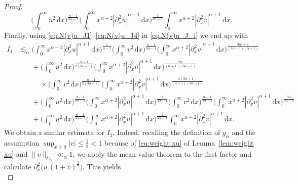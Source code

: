 \documentclass[10pt,a4paper]{amsart}
\renewcommand{\d}{\ensuremath{\mathrm{d}}}
\begin{document}
\begin{proof}
\begin{equation}
    \Big(\int_0^\infty u^2\, \d x\Big)^\frac{\alpha-1}{3\alpha-1}
    \Big(\int_0^\infty x^{\alpha+2} |\partial_x^2 u|^{\alpha+1} \, \d x\Big)^\frac{1}{3\alpha-1}
    \int_0^\infty x^{\alpha+2} |\partial_x^2 v|^{\alpha+1}\, \d x.
\end{equation}
%
Finally, using \eqref{eq:N(v)u_J1}--\eqref{eq:N(v)u_J4} in \eqref{eq:N(v)u_J_i} we end up with
%
\begin{align}\nonumber
    I_1
    &\lesssim_\alpha
    \Big(\int_0^\infty x^{\alpha+2} |\partial_x^2 u|^{\alpha+1}\, \d x\Big)^\frac{1}{\alpha+1}
    \Big(\int_0^\infty v^2\, \d x\Big)^\frac{\alpha-1}{3\alpha-1}
    \Big(\int_0^\infty x^{\alpha+2} |\partial_x^2 v|^{\alpha+1}\, \d x\Big)^\frac{3\alpha^2+1}{(3\alpha-1)(\alpha+1)}
    \\
    &\phantom{\lesssim_\alpha}
    +
    \Big(\int_0^\infty
    u^2\, \d x
    \Big)^\frac{\alpha-1}{2(3\alpha-1)}
    \Big(\int_0^\infty
    x^{\alpha+2} |\partial_x^2 u|^{\alpha+1}\, \d x
    \Big)^\frac{2\alpha}{(\alpha+1)(3\alpha-1)} \nonumber \\
    &\phantom{\lesssim_\alpha +} \times \Big(\int_0^\infty
    v^2\, \d x
    \Big)^\frac{\alpha-1}{2(3\alpha-1)} 
    \Big(\int_0^\infty
    x^{\alpha+2} |\partial_x^2 v|^{\alpha+1}\, \d x
    \Big)^\frac{\alpha(3\alpha+1)}{(\alpha+1)(3\alpha-1)}
    \nonumber \\
    &\phantom{\lesssim_\alpha}
    +
    \Big(\int_0^\infty u^2\, \d x\Big)^\frac{\alpha-1}{3\alpha-1}
    \Big(\int_0^\infty x^{\alpha+2} |\partial_x^2 u|^{\alpha+1} \, \d x\Big)^\frac{1}{3\alpha-1}
    \Big(\int_0^\infty
    v^2\, \d x
    \Big)^\frac{\alpha-1}{3\alpha-1} 
    \Big(\int_0^\infty
    x^{\alpha+2} |\partial_x^2 v|^{\alpha+1}\, \d x
    \Big)^\frac{3\alpha}{3\alpha-1}
    \nonumber \\
    &\phantom{\lesssim_\alpha}
    +
    \Big(\int_0^\infty u^2\, \d x\Big)^\frac{\alpha-1}{3\alpha-1}
    \Big(\int_0^\infty x^{\alpha+2} |\partial_x^2 u|^{\alpha+1} \, \d x\Big)^\frac{1}{3\alpha-1}
    \int_0^\infty x^{\alpha+2} |\partial_x^2 v|^{\alpha+1}\, \d x. \label{eq:N(v)u_I1}
\end{align} 
%
We obtain a similar estimate for $I_2$. Indeed, recalling the definition of $g_\alpha$ and the assumption $\sup_{x\geq 0} |v| \leq \frac{1}{2} < 1$ because of \eqref{eq:weight xu} of Lemma~\ref{lem:weight xu} and $\|v\|_{U_\alpha} \ll_\alpha 1$, we  apply the mean-value theorem to the first factor and calculate $\partial^2_x\bigl(u\,  (1+v)^{\frac{3}{2}}\bigr)$. This yields
%
\begin{equation*}

\end{equation*}
\end{proof}
\end{document}
